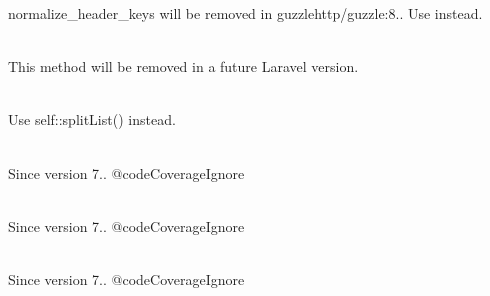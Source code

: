 \begin{DoxyRefList}
\label{deprecated__deprecated000088}%
%
normalize\+\_\+header\+\_\+keys will be removed in guzzlehttp/guzzle\+:8.. Use  instead.  
\item[Global \doxylink{class_illuminate_1_1_foundation_1_1_bootstrap_1_1_handle_exceptions_a9801b13485b56bcb65234a696bded1e3}{Handle\+Exceptions\+::forget\+App} ()]\hfill \\
\label{deprecated__deprecated000115}%
%
This method will be removed in a future Laravel version.  
\item[Global \doxylink{class_guzzle_http_1_1_psr7_1_1_header_ad63994a240a515477ff53b6e7eb4643f}{Header\+::normalize} (\$header)]\hfill \\
\label{deprecated__deprecated000094}%
%
Use self\+::split\+List() instead.  
\item[Global \doxylink{class_league_1_1_uri_1_1_http_a001fbbf722a45cddd2610e5a56573210}{Http\+::create\+From\+Base\+Uri} (Stringable\texorpdfstring{$\vert$}{|}string \$uri, Stringable\texorpdfstring{$\vert$}{|}string\texorpdfstring{$\vert$}{|}null \$base\+Uri=null)]\hfill \\
\label{deprecated__deprecated000144}%
%
Since version 7.. @code\+Coverage\+Ignore  
\item[Global \doxylink{class_league_1_1_uri_1_1_http_a2a24a65bc4ecf0cf30187526a075f56a}{Http\+::create\+From\+Components} (array \$components)]\hfill \\
\label{deprecated__deprecated000141}%
%
Since version 7.. @code\+Coverage\+Ignore  
\item[Global \doxylink{class_league_1_1_uri_1_1_http_adecc0f8402e4727d763b1ff9a8f8477e}{Http\+::create\+From\+Server} (array \$server)]\hfill \\
\label{deprecated__deprecated000142}%
%
Since version 7.. @code\+Coverage\+Ignore  
\item[Global \doxylink{class_league_1_1_uri_1_1_http_ae43ee1cef83e2bad9c5fa1da572fc448}{Http\+::create\+From\+String} (Stringable\texorpdfstring{$\vert$}{|}string \$uri=\textquotesingle{}\textquotesingle{})]\hfill \\
\label{deprecated__deprecated000140}%
%

\end{DoxyRefList}
